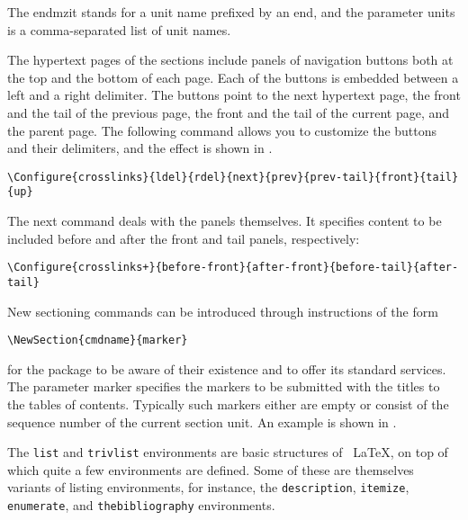 The endmzit stands for a unit name prefixed by an end, and the parameter units is a 
comma-separated list of unit names. 


The hypertext pages of the sections include panels of navigation buttons both at 
the top and the bottom of each page. Each of the buttons is embedded between a 
left and a right delimiter. The buttons point to the next hypertext page, the front 
and the tail of the previous page, the front and the tail of the current page, and 
the parent page. The following command allows you to customize the buttons and 
their delimiters, and the effect is shown in . 

\begin{lstlisting}
\Configure{crosslinks}{ldel}{rdel}{next}{prev}{prev-tail}{front}{tail}{up} 
\end{lstlisting}

The next command deals with the panels themselves. It specifies content to be 
included before and after the front and tail panels, respectively: 

\begin{lstlisting}
\Configure{crosslinks+}{before-front}{after-front}{before-tail}{after-tail} 
\end{lstlisting}


New sectioning commands can be introduced through instructions of the form 

\begin{lstlisting}
\NewSection{cmdname}{marker} 
\end{lstlisting}

for the \texht package to be aware of their existence and to offer its
standard services. The parameter marker specifies the markers to be
submitted with the titles to the tables of contents. Typically such
markers either are empty or consist of the sequence number of the
current section unit. An example is shown in . 
 


The \verb|list| and \verb|trivlist| environments are basic structures of \ \LaTeX, on
top of which quite a few environments are defined. Some of these are
themselves variants of listing environments, for instance, the
\verb|description|, \verb|itemize|, \verb|enumerate|, and \verb|thebibliography| environments. 

